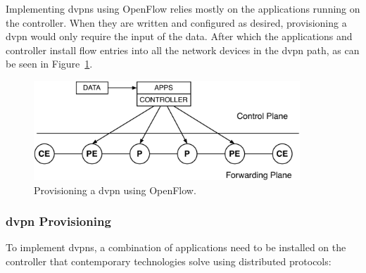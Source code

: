 Implementing \acp{dvpn} using OpenFlow relies mostly on the applications running on the controller. When they are written and configured as desired, provisioning a \ac{dvpn} would only require the input of the data. After which the applications and controller install flow entries into all the network devices in the \ac{dvpn} path, as can be seen in Figure~\ref{fig:nms-stack-of}.

\begin{figure}[h]
	\centering
	\includegraphics[width=10cm]{./includes/nms-stack-of.pdf}
	\caption{Provisioning a \ac{dvpn} using OpenFlow.}
	\label{fig:nms-stack-of}
\end{figure}

\subsubsection{\acs{dvpn} Provisioning} %
\label{ssub:dvpn_application}

To implement \acp{dvpn}, a combination of applications need to be installed on the controller that contemporary technologies solve using distributed protocols:

